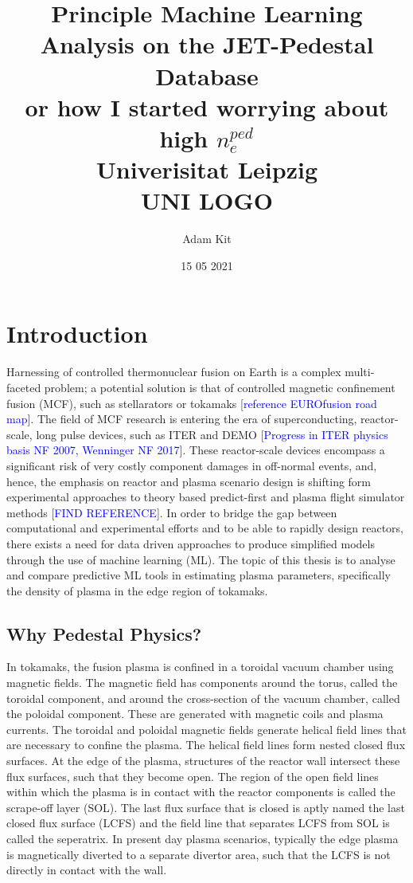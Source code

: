 \documentclass[a4paper, twoside, final, 12pt]{article}
\title{
	{Principle Machine Learning Analysis on the JET-Pedestal Database } \\ 
	{\large or how I started worrying about high $n_e^{ped}$}\\
	{\large Univerisitat Leipzig} \\
	{ UNI LOGO } \\ 
	}
\author{Adam Kit}
\date{15 05 2021}
\begin{document}
    \maketitle
    \newpage
    \tableofcontents
    \newpage
\section{Introduction}\label{sec:introduction}
Harnessing of controlled thermonuclear fusion on Earth is a complex multi-faceted problem; a potential solution is that of controlled magnetic confinement fusion (MCF), such as stellarators or tokamaks [\textcolor{blue}{reference EUROfusion road map}].
The field of MCF research is entering the era of superconducting, reactor-scale, long pulse devices, such as ITER and DEMO [\textcolor{blue}{Progress in ITER physics basis NF 2007, Wenninger NF 2017}].
These reactor-scale devices encompass a significant risk of very costly component damages in off-normal events, and, hence, the emphasis on reactor and plasma scenario design is shifting form experimental approaches to theory based predict-first and plasma flight simulator methods [\textcolor{blue}{FIND REFERENCE}].
In order to bridge the gap between computational and experimental efforts and to be able to rapidly design reactors, there exists a need for data driven approaches to produce simplified models through the use of machine learning (ML).
The topic of this thesis is to analyse and compare predictive ML tools in estimating plasma parameters, specifically the density of plasma in the edge region of tokamaks.

\subsection{Why Pedestal Physics?}\label{subsec:purpose}
In tokamaks, the fusion plasma is confined in a toroidal vacuum chamber using magnetic fields.
The magnetic field has components around the torus, called the toroidal component, and around the cross-section of the vacuum chamber, called the poloidal component.
These are generated with magnetic coils and plasma currents.
The toroidal and poloidal magnetic fields generate helical field lines that are necessary to confine the plasma.
The helical field lines form nested closed flux surfaces.
At the edge of the plasma, structures of the reactor wall intersect these flux surfaces, such that they become open.
The region of the open field lines within which the plasma is in contact with the reactor components is called the scrape-off layer (SOL).
The last flux surface that is closed is aptly named the last closed flux surface (LCFS) and the field line that separates LCFS from SOL is called the seperatrix.
In present day plasma scenarios, typically the edge plasma is magnetically diverted to a separate divertor area, such that the LCFS is not directly in contact with the wall.
\end{document}
